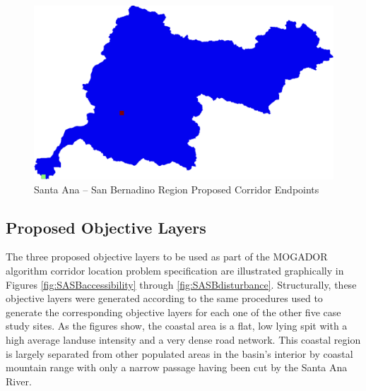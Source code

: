         \begin{figure}[!h]
            \begin{center}
            \includegraphics[width=5.5in]{figures/SanBernadino_Endpoints.png}   
            \caption{Santa Ana -- San Bernadino Region Proposed Corridor Endpoints}
            \label{fig:SASBendpoints}
            \end{center}
        \end{figure}
    
    \subsection{Proposed Objective Layers}
    
The three proposed objective layers to be used as part of the MOGADOR algorithm corridor location problem specification are illustrated graphically in Figures \ref{fig:SASBaccessibility} through \ref{fig:SASBdisturbance}. Structurally, these objective layers were generated according to the same procedures used to generate the corresponding objective layers for each one of the other five case study sites. As the figures show, the coastal area is a flat, low lying spit with a high average landuse intensity and a very dense road network. This coastal region is largely separated from other populated areas in the basin's interior by coastal mountain range with only a narrow passage having been cut by the Santa Ana River.  

